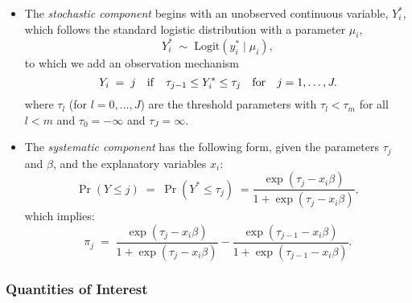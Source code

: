 \documentclass{article}
\begin{document}
\begin{itemize}
\item The \emph{stochastic component} begins with an unobserved continuous
  variable, $Y^*_i$, which follows the standard logistic distribution
  with a parameter $\mu_i$,
  \begin{equation*}
    Y_i^* \; \sim \; \textrm{Logit}(y_i^* \mid \mu_i),  
  \end{equation*}
  to which we add an observation mechanism
  \begin{equation*}
    Y_i \; = \; j \quad {\rm if} \quad \tau_{j-1} \le Y_i^* \le \tau_j
    \quad {\rm for} \quad j=1,\dots,J.
  \end{equation*}
  where $\tau_l$ (for $l=0,\dots,J$) are the threshold parameters with
  $\tau_l < \tau_m$ for all $l<m$ and $\tau_0=-\infty$ and
  $\tau_J=\infty$.
  
\item The \emph{systematic component} has the following form, given
  the parameters $\tau_j$ and $\beta$, and the explanatory variables $x_i$: 
  \begin{equation*}
    \Pr(Y \le j) \; = \; \Pr(Y^* \le \tau_j) \; = \frac{\exp(\tau_j -
      x_i \beta)}{1+\exp(\tau_j -x_i \beta)},
  \end{equation*}
  which implies:
  \begin{equation*}
    \pi_{j}  \; = \; \frac{\exp(\tau_j - x_i \beta)}{1 + \exp(\tau_j -
      x_i \beta)} - \frac{\exp(\tau_{j-1} - x_i \beta)}{1 +
      \exp(\tau_{j-1} - x_i \beta)}.
  \end{equation*}
\end{itemize}

\subsubsection{Quantities of Interest} 
\end{document}
